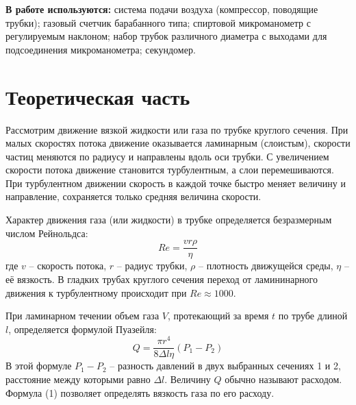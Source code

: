 \documentclass[a4paper,12pt]{article} %
\begin{document}
\textbf{В работе используются:} система подачи воздуха (компрессор, поводящие трубки); газовый счетчик барабанного типа; спиртовой микроманометр с регулируемым наклоном; набор трубок различного диаметра с выходами для подсоединения микроманометра; секундомер.


\section{Теоретическая часть}
Рассмотрим движение вязкой жидкости или газа по трубке круглого сечения. При малых скоростях потока движение оказывается ламинарным (слоистым), скорости частиц меняются по радиусу и направлены вдоль оси трубки. С увеличением скорости потока движение становится турбулентным, а слои перемешиваются. При турбулентном движении скорость в каждой точке быстро меняет величину и направление, сохраняется только средняя величина скорости.

Характер движения газа (или жидкости) в трубке определяется безразмерным числом Рейнольдса:
\[
	Re = \frac{vr\rho}{\eta}
\]
где $v$ -- скорость потока, $r$ -- радиус трубки, $\rho$ -- плотность движущейся среды, $\eta$ -- её вязкость. В гладких трубах круглого сечения переход от ламининарного движения к турбулентному происходит при $Re \approx 1000$.

При ламинарном течении объем газа $V$, протекающий за время $t$ по трубе длиной $l$, определяется формулой Пуазейля:
\begin{equation}
	Q = \frac{\pi r^4}{8 \Delta l \eta}(P_1 - P_2)
\end{equation}
В этой формуле $P_1 - P_2$ -- разность давлений в двух выбранных сечениях 1 и 2, расстояние между которыми равно $\Delta l$. Величину $Q$ обычно называют расходом. Формула (1) позволяет определять вязкость газа по его расходу.
\end{document}
